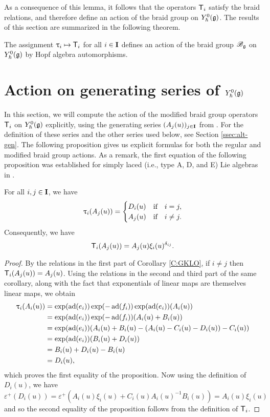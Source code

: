 As a consequence of this lemma, it follows that the operators $\mbraid_i$ satisfy the braid relations, and therefore define an action of the braid group on $\Yhg[0]$.
The results of this section are summarized in the following theorem.

\begin{theorem}\label{T:mbraid-action}
    The assignment $\braid_i\mapsto\mbraid_i$ for all $i\in\I$ defines an action of the braid group $\Bg$ on $\Yhg[0]$ by Hopf algebra automorphisms.
\end{theorem}


\section{Action on generating series of \texorpdfstring{$\Yhg[0]$}{Y0}}

In this section, we will compute the action of the modified braid group operators $\mbraid_i$ on $\Yhg[0]$ explicitly, using the generating series $(A_j(u))_{j\in\I}$ from \cite{gerasimov_class_2005}.
For the definition of these series and the other series used below, see Section \ref{ssec:alt-gen}.
The following proposition gives us explicit formulas for both the regular and modified braid group actions.
As a remark, the first equation of the following proposition was established for simply laced (i.e., type A, D, and E) Lie algebras in \cite[Lem. 5.3.16]{weekes_highest_2016}.

\begin{proposition}\label{P:tau-a}
    For all $i,j\in\I$, we have
    \[\braid_i(A_j(u)) =
    \begin{cases}
        D_i(u) & \text{if}\quad i=j, \\
        A_j(u) & \text{if}\quad i\neq j.
    \end{cases}\]
    Consequently, we have
    \[\mbraid_i(A_j(u)) = A_j(u)\xi_i(u)^{\delta_{ij}}.\]
\end{proposition}
\begin{proof}
    By the relations in the first part of Corollary \ref{C:GKLO}, if $i\neq j$ then $\mbraid_i(A_j(u)) = A_j(u)$.
    Using the relations in the second and third part of the same corollary, along with the fact that exponentials of linear maps are themselves linear maps, we obtain
    \begin{align*}
        \braid_i(A_i(u)) &= \exp(\ad(e_i))\exp(-\ad(f_i))\exp(\ad(e_i))(A_i(u)) \\
        &= \exp(\ad(e_i))\exp(-\ad(f_i))(A_i(u) + B_i(u)) \\
        &= \exp(\ad(e_i))(A_i(u) + B_i(u) - (A_i(u) - C_i(u) - D_i(u)) - C_i(u)) \\
        &= \exp(\ad(e_i))(B_i(u) + D_i(u)) \\
        &= B_i(u) + D_i(u) - B_i(u) \\
        &= D_i(u),
    \end{align*}
    which proves the first equality of the proposition.
    Now using the definition of $D_i(u)$, we have
    \[\varepsilon^+(D_i(u)) = \varepsilon^+(A_i(u)\xi_i(u) + C_i(u)A_i(u)^{-1}B_i(u)) = A_i(u)\xi_i(u)\]
    and so the second equality of the proposition follows from the definition of $\mbraid_i$.
\end{proof}

